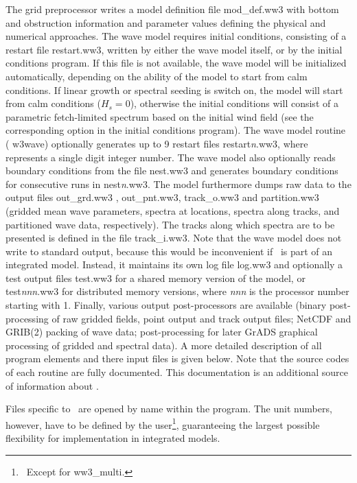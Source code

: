 The grid preprocessor writes a model definition file {\file mod\_def.ww3} with
bottom and obstruction information and parameter values defining the physical
and numerical approaches. The wave model requires initial conditions,
consisting of a restart file {\file restart.ww3}, written by either the wave
model itself, or by the initial conditions program. If this file is not
available, the wave model will be initialized automatically, depending on the
ability of the model to start from calm conditions. If linear growth or
spectral seeding is switch on, the model will start from calm conditions ($H_s
= 0$), otherwise the initial conditions will consist of a parametric
fetch-limited spectrum based on the initial wind field (see the corresponding
option in the initial conditions program).  The wave model routine ({\F
  w3wave}) optionally generates up to 9 restart files {\file
  restart{\em{n}}.ww3}, where {} represents a single digit
integer number. The wave model also optionally reads boundary conditions from
the file {\file nest.ww3} and generates boundary conditions for consecutive
runs in {\file nest{\em{n}}.ww3}. The model furthermore dumps raw data to the
output files {\file out\_grd.ww3 }, {\file out\_pnt.ww3}, {\file track\_o.ww3}
and {\file partition.ww3} (gridded mean wave parameters, spectra at locations,
spectra along tracks, and partitioned wave data, respectively). The tracks
along which spectra are to be presented is defined in the file {\file
  track\_i.ww3}. Note that the wave model does not write to standard output,
because this would be inconvenient if \ws\ is part of an integrated
model. Instead, it maintains its own log file {\file log.ww3} and optionally a
test output files {\file test.ww3} for a shared memory version of the model,
or {\file test{\em{nnn}}.ww3} for distributed memory versions, where {\em nnn}
is the processor number starting with 1.  Finally, various output
post-processors are available (binary post-processing of raw gridded fields,
point output and track output files; NetCDF and GRIB(2) packing of wave data;
post-processing for later GrADS graphical processing of gridded and spectral
data). A more detailed description of all program elements and there input
files is given below. Note that the source codes of each routine are fully
documented. This documentation is an additional source of information about
\ws.



Files specific to \ws\ are opened by name within the program. The unit
numbers, however, have to be defined by the user\footnote{~Except for {\file
ww3\_multi}.}, guaranteeing the largest possible flexibility for
implementation in integrated models.

